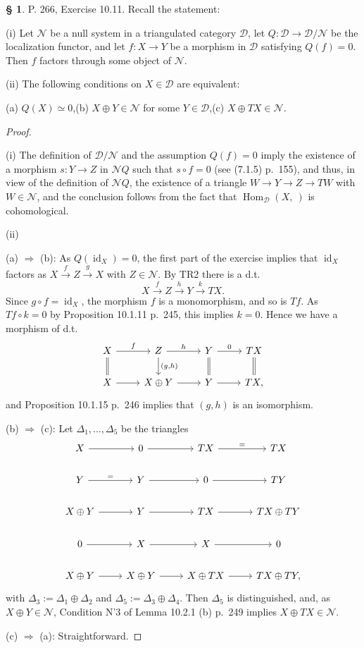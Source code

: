 \documentclass[12pt]{article}
\theoremstyle{remark}
\theoremstyle{definition}
\newtheorem{s}[thm]{\S}
\newcommand{\cc}{\mathcal}
\newcommand{\then}{\Rightarrow}
\newcommand{\xr}{\xrightarrow}
\DeclareMathOperator{\id}{id}
\DeclareMathOperator{\Hom}{Hom}%
\begin{document}
\begin{s} P. 266, Exercise 10.11. Recall the statement: 

\noindent(i) Let $\cc N$ be a null system in a triangulated category $\cc D$, let $Q:\cc D\to\cc D/\cc N$ be the localization functor, and let $f:X\to Y$ be a morphism in $\cc D$ satisfying $Q(f)=0$. Then $f$ factors through some object of $\cc N$. 

\noindent(ii) The following conditions on $X\in\cc D$ are equivalent: 

\noindent(a) $Q(X)\simeq0$,\quad(b) $X\oplus Y\in\cc N$ for some $Y\in\cc D$,\quad(c) $X\oplus TX\in\cc N$.

\begin{proof}\ 

\noindent(i) The definition of $\cc D/\cc N$ and the assumption $Q(f)=0$ imply the existence of a morphism $s:Y\to Z$ in $\cc NQ$ such that $s\circ f=0$ (see (7.1.5) p.~155), and thus, in view of the definition of $\cc NQ$, the existence of a triangle $W\to Y\to Z\to TW$ with $W\in\cc N$, and the conclusion follows from the fact that $\Hom_{\cc D}(X,\ )$ is cohomological. 

\noindent(ii)

\noindent(a) $\then$ (b): As $Q(\id_X)=0$, the first part of the exercise implies that $\id_X$ factors as $X\xr fZ\xr g X$ with $Z\in\cc N$. By TR2 there is a d.t. 
$$
X\xr fZ\xr hY\xr kTX.
$$ 
Since $g\circ f=\id_X$, the morphism $f$ is a monomorphism, and so is $Tf$. As $Tf\circ k=0$ by Proposition 10.1.11 p.~245, this implies $k=0$. Hence we have a morphism of d.t. 
$$
\begin{tikzcd}
X\ar[equal]{d}\ar{r}{f}&Z\ar{d}{(g,h)}\ar{r}{h}&Y\ar[equal]{d}\ar{r}{0}&TX\ar[equal]{d}\\ 
X\ar{r}&X\oplus Y\ar{r}&Y\ar{r}&TX,
\end{tikzcd}
$$
and Proposition 10.1.15 p.~246 implies that $(g,h)$ is an isomorphism.\bigskip 

\noindent(b) $\then$ (c): Let $\Delta_1,\dots,\Delta_5$ be the triangles
$$
\begin{tikzcd}
X\ar{r}&0\ar{r}&TX\ar{r}{=}&TX\\ 
Y\ar{r}{=}&Y\ar{r}&0\ar{r}&TY\\ 
X\oplus Y\ar{r}&Y\ar{r}&TX\ar{r}&TX\oplus TY\\ 
0\ar{r}&X\ar{r}&X\ar{r}&0\\ 
X\oplus Y\ar{r}&X\oplus Y\ar{r}&X\oplus TX\ar{r}&TX\oplus TY,
\end{tikzcd}
$$ 
with $\Delta_3:=\Delta_1\oplus\Delta_2$ and $\Delta_5:=\Delta_3\oplus\Delta_4$. Then $\Delta_5$ is distinguished, and, as $X\oplus Y\in\cc N$, Condition N'3 of Lemma 10.2.1 (b) p.~249 implies $X\oplus TX\in\cc N$.

\noindent(c) $\then$ (a): Straightforward.
\end{proof}
\end{s}
%
%
\end{document}
